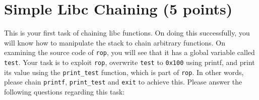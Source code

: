 \documentclass[a4paper,11pt]{article}
\begin{document}
\section*{Simple Libc Chaining (5 points)}

This is your first task of chaining libc functions. On doing this successfully,
you will know how to manipulate the stack to chain arbitrary functions. On
examining the source code of \texttt{rop}, you will see that it has a global
variable called \texttt{test}. Your task is to exploit \texttt{rop}, overwrite
\texttt{test} to \texttt{0x100} using printf, and print its value using the
\texttt{print\_test} function, which is part of \texttt{rop}. In other words,
please chain \texttt{printf}, \texttt{print\_test} and \texttt{exit} to achieve
this. Please answer the following questions regarding this task:
\end{document}
